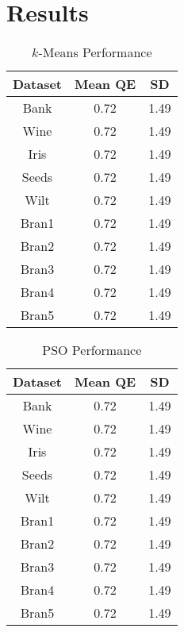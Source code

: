 \documentclass[conference]{IEEEtran}
\begin{document}
\section{Results}

  \begin{table}[h]
  \caption{$k$-Means Performance}
  \resizebox{1.3\textwidth}{!} {\begin{minipage}{\textwidth}
      
      \begin{tabular}{ c |c | c }
        Dataset & Mean QE & SD \\ \hline
        Bank & 0.72 & 1.49 \\
        Wine & 0.72 & 1.49 \\
        Iris & 0.72 & 1.49 \\
        Seeds & 0.72 & 1.49 \\
        Wilt & 0.72 & 1.49 \\
        Bran1 & 0.72 & 1.49 \\
        Bran2 & 0.72 & 1.49 \\
        Bran3 & 0.72 & 1.49 \\
        Bran4 & 0.72 & 1.49 \\
        Bran5 & 0.72 & 1.49
      \end{tabular}

      \label{table:kmError}
  \end{minipage} }
  \end{table}
  
  \begin{table}[h]
  \caption{PSO Performance}
  \resizebox{1.3\textwidth}{!} {\begin{minipage}{\textwidth}
      
      \begin{tabular}{ c |c | c }
        Dataset & Mean QE & SD \\ \hline
        Bank & 0.72 & 1.49 \\
        Wine & 0.72 & 1.49 \\
        Iris & 0.72 & 1.49 \\
        Seeds & 0.72 & 1.49 \\
        Wilt & 0.72 & 1.49 \\
        Bran1 & 0.72 & 1.49 \\
        Bran2 & 0.72 & 1.49 \\
        Bran3 & 0.72 & 1.49 \\
        Bran4 & 0.72 & 1.49 \\
        Bran5 & 0.72 & 1.49
      \end{tabular}

      \label{table:psoError}
  \end{minipage} }
  \end{table}
  
\end{document}
